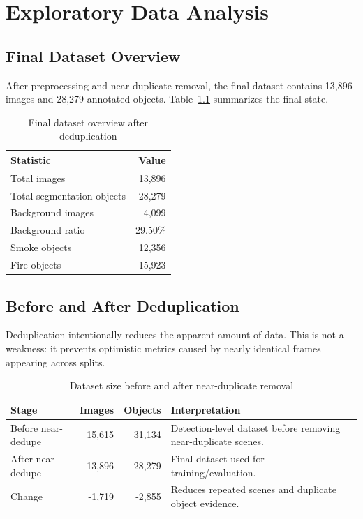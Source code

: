 \documentclass[12pt,a4paper]{report}
\begin{document}
\chapter{Exploratory Data Analysis}
\section{Final Dataset Overview}
After preprocessing and near-duplicate removal, the final dataset contains 13,896 images and 28,279 annotated objects. Table~\ref{tab:dataset-overview} summarizes the final state.

\begin{table}[H]
\centering
\caption{Final dataset overview after deduplication}
\label{tab:dataset-overview}
\begin{tabular}{lr}
\toprule
\textbf{Statistic} & \textbf{Value} \\
\midrule
Total images & 13,896 \\
Total segmentation objects & 28,279 \\
Background images & 4,099 \\
Background ratio & 29.50\% \\
Smoke objects & 12,356 \\
Fire objects & 15,923 \\
\bottomrule
\end{tabular}
\end{table}

\section{Before and After Deduplication}
Deduplication intentionally reduces the apparent amount of data. This is not a weakness: it prevents optimistic metrics caused by nearly identical frames appearing across splits.

\begin{table}[H]
\centering
\caption{Dataset size before and after near-duplicate removal}
\label{tab:dedupe-impact}
\begin{tabular}{lrrp{}}
\toprule
\textbf{Stage} & \textbf{Images} & \textbf{Objects} & \textbf{Interpretation} \\
\midrule
Before near-dedupe & 15,615 & 31,134 & Detection-level dataset before removing near-duplicate scenes. \\
After near-dedupe & 13,896 & 28,279 & Final dataset used for training/evaluation. \\
Change & -1,719 & -2,855 & Reduces repeated scenes and duplicate object evidence. \\
\bottomrule
\end{tabular}
\end{table}
\end{document}
